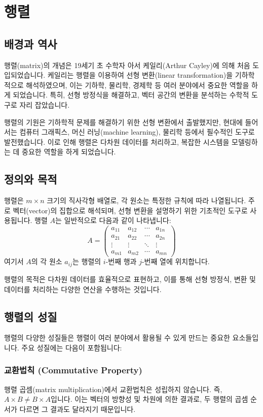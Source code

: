 \section{행렬}

\subsection{배경과 역사}
행렬(matrix)의 개념은 19세기 초 수학자 아서 케일리(Arthur Cayley)에 의해 처음 도입되었습니다. 케일리는 행렬을 이용하여 선형 변환(linear transformation)을 기하학적으로 해석하였으며, 이는 기하학, 물리학, 경제학 등 여러 분야에서 중요한 역할을 하게 되었습니다. 특히, 선형 방정식을 해결하고, 벡터 공간의 변환을 분석하는 수학적 도구로 자리 잡았습니다.

행렬의 기원은 기하학적 문제를 해결하기 위한 선형 변환에서 출발했지만, 현대에 들어서는 컴퓨터 그래픽스, 머신 러닝(machine learning), 물리학 등에서 필수적인 도구로 발전했습니다. 이로 인해 행렬은 다차원 데이터를 처리하고, 복잡한 시스템을 모델링하는 데 중요한 역할을 하게 되었습니다.

\subsection{정의와 목적}
행렬은 \(m \times n\) 크기의 직사각형 배열로, 각 원소는 특정한 규칙에 따라 나열됩니다. 주로 벡터(vector)의 집합으로 해석되며, 선형 변환을 설명하기 위한 기초적인 도구로 사용됩니다. 행렬 \(A\)는 일반적으로 다음과 같이 나타냅니다:
\[
  A = \begin{pmatrix} a_{11} & a_{12} & \cdots & a_{1n} \\ a_{21} & a_{22} & \cdots & a_{2n} \\ \vdots & \vdots & \ddots & \vdots \\ a_{m1} & a_{m2} & \cdots & a_{mn} \end{pmatrix}
\]
여기서 \(A\)의 각 원소 \(a_{ij}\)는 행렬의 \(i\)-번째 행과 \(j\)-번째 열에 위치합니다.

행렬의 목적은 다차원 데이터를 효율적으로 표현하고, 이를 통해 선형 방정식, 변환 및 데이터를 처리하는 다양한 연산을 수행하는 것입니다.

\subsection{행렬의 성질}
행렬의 다양한 성질들은 행렬이 여러 분야에서 활용될 수 있게 만드는 중요한 요소들입니다. 주요 성질에는 다음이 포함됩니다:

\subsubsection{교환법칙 (Commutative Property)}
행렬 곱셈(matrix multiplication)에서 교환법칙은 성립하지 않습니다. 즉, \( A \times B \neq B \times A \)입니다. 이는 벡터의 방향성 및 차원에 의한 결과로, 두 행렬의 곱셈 순서가 다르면 그 결과도 달라지기 때문입니다.

